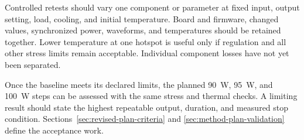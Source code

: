 Controlled retests should vary one component or parameter at fixed input,
output setting, load, cooling, and initial temperature. Board and firmware,
changed values, synchronized power, waveforms, and temperatures should be
retained together. Lower temperature at one hotspot is useful only if regulation and all
other stress limits remain acceptable. Individual component losses have
not yet been separated.

Once the baseline meets its declared limits, the planned
\SI{90}{\watt}, \SI{95}{\watt}, and \SI{100}{\watt} steps can be
assessed with the same stress and thermal checks. A limiting result should
state the highest repeatable output, duration, and measured stop condition.
Sections~\ref{sec:revised-plan-criteria} and
\ref{sec:method-plan-validation} define the acceptance work.
